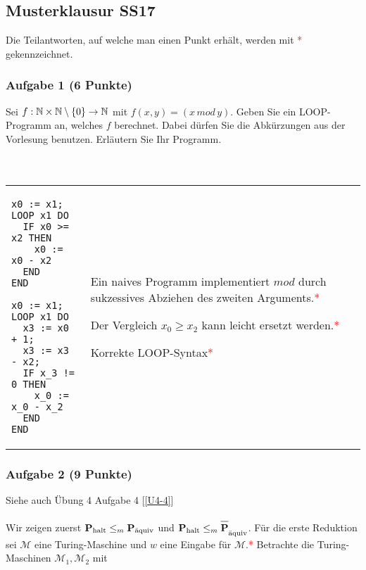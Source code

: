 
\newcommand{\copaq}{\overline{\mbox{\prob{P}\strut}}_{\text{äquiv}}}
\newcommand{\M}{\mathcal{M}}
\newcommand{\POINT}{{\textcolor{red}{* }}}
\subsection*{Musterklausur SS17}
Die Teilantworten, auf welche man einen Punkt erhält, werden mit \POINT gekennzeichnet.
\subsubsection*{Aufgabe 1 (6 Punkte)}
Sei $f: \N \times \N \setminus \{0\} \to \N$ mit $f(x,y)=(x\,mod\,y)$. Geben Sie ein LOOP-Programm an, welches $f$ berechnet. Dabei dürfen Sie die Abkürzungen aus der Vorlesung benutzen. Erläutern Sie Ihr Programm. \\\\
\LOES \\
\begin{tabular}{p{} p{}}
\begin{lstlisting}
x0 := x1;
LOOP x1 DO  
  IF x0 >= x2 THEN
    x0 := x0 - x2
  END
END
\end{lstlisting}
\begin{lstlisting}
x0 := x1;
LOOP x1 DO  
  x3 := x0 + 1;
  x3 := x3 - x2;
  IF x_3 != 0 THEN
    x_0 := x_0 - x_2
  END
END
\end{lstlisting}
& 
\vspace{1.5cm}
Ein naives Programm implementiert $mod$ durch sukzessives Abziehen des zweiten Arguments.\POINT \newline

Der Vergleich $x_0 \geq x_2$ kann leicht ersetzt werden.\POINT \newline

Korrekte LOOP-Syntax\POINT

\end{tabular}

\subsubsection*{Aufgabe 2 (9 Punkte)}
\label{MUSTER-2}
Siehe auch Übung 4 Aufgabe 4 [\ref{U4-4}] \\\\
\LOES Wir zeigen zuerst $\phalt \leq_m \paq$ und $\phalt \leq_m \copaq$. Für die erste Reduktion sei $\M$ eine Turing-Maschine und $w$ eine Eingabe für $\M$.\POINT Betrachte die Turing-Maschinen $\M_1,\M_2$ mit \\

